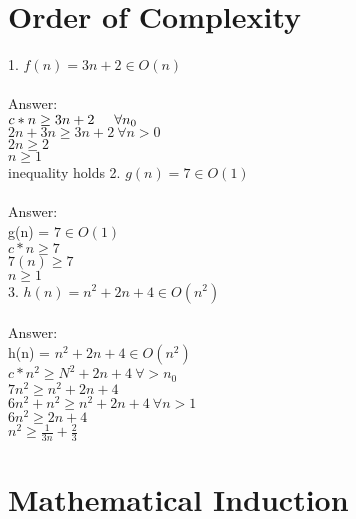 \documentclass[11pt]{article}
\begin{document}
\section{Order of Complexity}

	1. $f(n) = 3n + 2 \in O(n)$\\\\
	Answer:\\
	$ c * n  \geq  3n + 2  \hspace{.5cm} \forall n_0 $\\
	$2n + 3n \geq 3n+2  \ \forall n > 0 $\\
	$ 2n \geq 2$\\
	$n \geq 1$\\
inequality holds
	2. $g(n) = 7 \in O(1)$\\\\
	Answer:\\
	g(n) = $ 7 \in O(1)$\\
	$ c * n \geq 7$\\
	$ 7(n) \geq 7$\\
	$ n \geq 1$\\

	3. $h(n) = n^2 + 2n + 4 \in O(n^2)$\\\\
	Answer:\\
h(n) = $ n^{2} + 2n + 4 \in O(n^{2})$\\
$c * n^{2} \geq N^{2} +2n + 4 \ \forall > n_0 $\\
$ 7n^{2} \geq n^{2} + 2n + 4 $\\
$ 6n^{2} + n^{2} \geq n^{2} + 2n + 4  \  \forall n > 1$\\
$ 6n^{2} \geq 2n + 4 $\\
$  n^{2} \geq  \frac{1}{3n} + \frac{2}{3}$\\


\section{Mathematical Induction}
\end{document}

